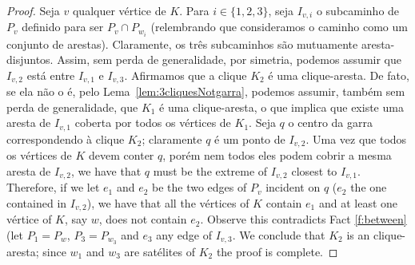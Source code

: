 \begin{proof}
Seja $v$ qualquer vértice de $K$. Para $i\in \{1,2,3\}$, seja $I_{v,i}$ o subcaminho de  $P_v$
definido para ser $P_v\cap P_{w_i}$ (relembrando que consideramos o caminho como um conjunto de arestas). Claramente, os três subcaminhos são mutuamente aresta-disjuntos. Assim, sem perda de generalidade, por simetria, podemos assumir que 
$I_{v,2}$ está entre $I_{v,1}$ e $I_{v,3}$. Afirmamos que a clique $K_2$ é uma clique-aresta.
De fato, se ela não o é, %
pelo Lema~\ref{lem:3cliquesNotgarra}, podemos assumir, também sem perda de generalidade, que $K_1$ é uma clique-aresta, o que implica que existe uma aresta  de $I_{v,1}$ coberta por todos os vértices de $K_1$.  Seja $q$ o centro da garra correspondendo à clique $K_2$; claramente $q$ é um ponto de $I_{v,2 }$. Uma vez que todos os vértices de $K$ devem conter $q$, porém nem todos eles podem cobrir a mesma aresta de $I_{v,2}$, we have that $q$ must be the extreme of  $I_{v,2}$ closest to  $I_{v,1}$. Therefore, if we let $e_1$ and $e_2$ be the two edges of $P_v$ incident on $q$ ($e_2$ the one contained in $I_{v,2}$),
we have that  all the vértices of $K$
contain  $e_1$ and at least one vértice of $K$, say $w$,  does not contain $e_2$. Observe this contradicts Fact \ref{f:between} (let $P_1=P_w$, $P_3=P_{w_3}$ and $e_3$ any edge of $I_{v,3}$. We conclude that $K_2$ is an clique-aresta; since $w_1$ and $w_3$ are satélites of $K_2$ the proof is complete. 


\end{proof}
